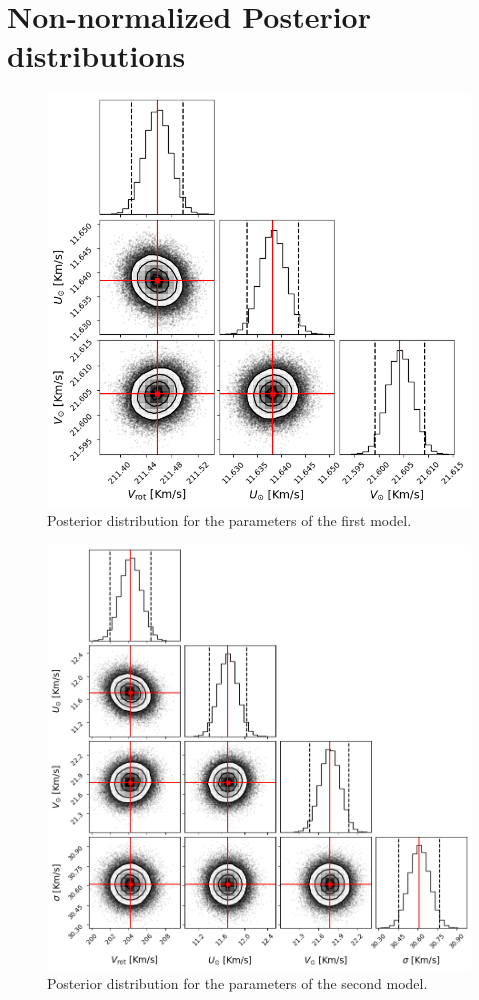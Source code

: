 \newpage
\appendix

\section{Non-normalized Posterior distributions}\label{Appendix:PosteriorDistributions}

\begin{figure}[h]
    \centering
    \includegraphics[width = 0.8\linewidth]{Fig/PosteriorSimple.png}
    \caption{Posterior distribution for the parameters of the first model.}\label{fig:PosteriorSimple}
\end{figure}

\begin{figure}[h]
    \centering
    \includegraphics[width = 0.8\linewidth]{Fig/PosteriorFull.png}
    \caption{Posterior distribution for the parameters of the second model.}\label{fig:PosteriorFull}
\end{figure}